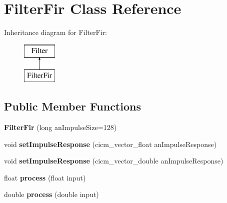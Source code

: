 \hypertarget{class_filter_fir}{\section{Filter\-Fir Class Reference}
\label{class_filter_fir}
}
Inheritance diagram for Filter\-Fir\-:\begin{figure}[H]
\begin{center}
\leavevmode
\includegraphics[height=2.000000cm]{class_filter_fir}
\end{center}
\end{figure}
\subsection*{Public Member Functions}
\begin{DoxyCompactItemize}
\item 
\hypertarget{class_filter_fir_abcab39dfa873e970726d22a1ba6be737}{{\bfseries Filter\-Fir} (long an\-Impulse\-Size=128)}\label{class_filter_fir_abcab39dfa873e970726d22a1ba6be737}

\item 
\hypertarget{class_filter_fir_a3974b796ce6147611991dbca668ea8fa}{void {\bfseries set\-Impulse\-Response} (cicm\-\_\-vector\-\_\-float an\-Impulse\-Response)}\label{class_filter_fir_a3974b796ce6147611991dbca668ea8fa}

\item 
\hypertarget{class_filter_fir_af49512720e54e2388d36c310ef77b327}{void {\bfseries set\-Impulse\-Response} (cicm\-\_\-vector\-\_\-double an\-Impulse\-Response)}\label{class_filter_fir_af49512720e54e2388d36c310ef77b327}

\item 
\hypertarget{class_filter_fir_adc63b066e4a6774fbafa6a4d2bb74e96}{float {\bfseries process} (float input)}\label{class_filter_fir_adc63b066e4a6774fbafa6a4d2bb74e96}

\item 
\hypertarget{class_filter_fir_a52821e4b331b0cfa7724db923d2c2361}{double {\bfseries process} (double input)}\label{class_filter_fir_a52821e4b331b0cfa7724db923d2c2361}

\end{DoxyCompactItemize}
